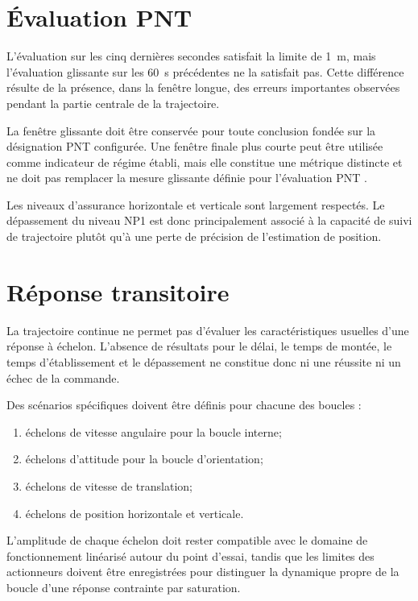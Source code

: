 \documentclass[11pt,a4paper,oneside]{report}
\begin{document}
\section{Évaluation PNT}

L'évaluation sur les cinq dernières secondes satisfait la limite de \SI{1}{m}, mais l'évaluation glissante sur les \SI{60}{s} précédentes ne la satisfait pas. Cette différence résulte de la présence, dans la fenêtre longue, des erreurs importantes observées pendant la partie centrale de la trajectoire.

La fenêtre glissante doit être conservée pour toute conclusion fondée sur la désignation PNT configurée. Une fenêtre finale plus courte peut être utilisée comme indicateur de régime établi, mais elle constitue une métrique distincte et ne doit pas remplacer la mesure glissante définie pour l'évaluation PNT \cite{ASTM_F3609_25}.

Les niveaux d'assurance horizontale et verticale sont largement respectés. Le dépassement du niveau NP1 est donc principalement associé à la capacité de suivi de trajectoire plutôt qu'à une perte de précision de l'estimation de position.

\section{Réponse transitoire}

La trajectoire continue ne permet pas d'évaluer les caractéristiques usuelles d'une réponse à échelon. L'absence de résultats pour le délai, le temps de montée, le temps d'établissement et le dépassement ne constitue donc ni une réussite ni un échec de la commande.

Des scénarios spécifiques doivent être définis pour chacune des boucles :
\begin{enumerate}
	\item échelons de vitesse angulaire pour la boucle interne;
	\item échelons d'attitude pour la boucle d'orientation;
	\item échelons de vitesse de translation;
	\item échelons de position horizontale et verticale.
\end{enumerate}

L'amplitude de chaque échelon doit rester compatible avec le domaine de fonctionnement linéarisé autour du point d'essai, tandis que les limites des actionneurs doivent être enregistrées pour distinguer la dynamique propre de la boucle d'une réponse contrainte par saturation.
\end{document}
